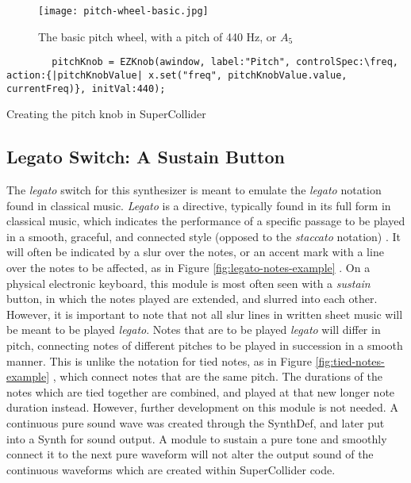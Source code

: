 \begin{figure}
  \centering
  \texttt{[image: pitch-wheel-basic.jpg]}
  \caption{The basic pitch wheel, with a pitch of 440 Hz, or $A_5$}
  \label{fig:pitch-wheel-basic}
\end{figure}

\begin{listing}
	\begin{lstlisting}
		pitchKnob = EZKnob(awindow, label:"Pitch", controlSpec:\freq, action:{|pitchKnobValue| x.set("freq", pitchKnobValue.value, currentFreq)}, initVal:440);
	\end{lstlisting}
	\caption{Creating the pitch knob in SuperCollider}
	\label{lst:pitch-knob-waveform}
\end{listing}



\subsection{Legato Switch: A Sustain Button}

The \textit{legato} switch for this synthesizer is meant to emulate the \textit{legato} notation found in classical music. \textit{Legato} is a directive, typically found in its full form in classical music, which indicates the performance of a specific passage to be played in a smooth, graceful, and connected style (opposed to the \textit{staccato} notation) \cite{Winer_2018}. It will often be indicated by a slur over the notes, or an accent mark with a line over the notes to be affected, as in Figure \ref{fig:legato-notes-example} \cite{Henle_2009}. On a physical electronic keyboard, this module is most often seen with a \textit{sustain} button, in which the notes played are extended, and slurred into each other. However, it is important to note that not all slur lines in written sheet music will be meant to be played \textit{legato}. Notes that are to be played \textit{legato} will differ in pitch, connecting notes of different pitches to be played in succession in a smooth manner. This is unlike the notation for tied notes, as in Figure \ref{fig:tied-notes-example} \cite{Lung_2016}, which connect notes that are the same pitch. The durations of the notes which are tied together are combined, and played at that new longer note duration instead. However, further development on this module is not needed. A continuous pure sound wave was created through the SynthDef, and later put into a Synth for sound output. A module to sustain a pure tone and smoothly connect it to the next pure waveform will not alter the output sound of the continuous waveforms which are created within SuperCollider code.

